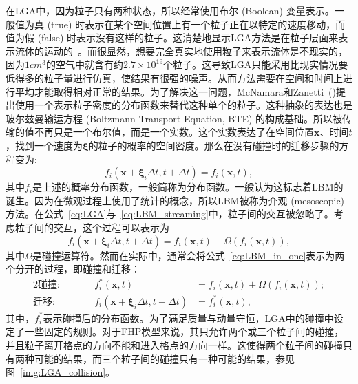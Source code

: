 在LGA中，因为粒子只有两种状态，所以经常使用布尔 (Boolean) 变量表示。一般值为真 (true) 时表示在某个空间位置上有一个粒子正在以特定的速度移动，而值为假 (false) 时表示没有这样的粒子。这清楚地显示LGA方法是在粒子层面来表示流体的运动的~\cite{wolf2004lattice}。而很显然，想要完全真实地使用粒子来表示流体是不现实的，因为$1cm^3$的空气中就含有约$2.7\times 10^{19}$个粒子。这导致LGA只能采用比现实情况要低得多的粒子量进行仿真，使结果有很强的噪声。从而方法需要在空间和时间上进行平均才能取得相对正常的结果。为了解决这一问题，McNamara和Zanetti~(\citeyear{mcnamara1988use})提出使用一个表示粒子密度的分布函数来替代这种单个的粒子。这种抽象的表达也是玻尔兹曼输运方程 (Boltzmann Transport Equation, BTE) 的构成基础。所以被传输的值不再只是一个布尔值，而是一个实数。这个实数表达了在空间位置$\mathbf{x}$、时间$t$，找到一个速度为$\mathbf{\xi}$的粒子的概率的空间密度。那么在没有碰撞时的迁移步骤的方程变为:
\begin{equation}
    f_{i}(\mathbf{x}+\mathbf{\xi}_i \Delta t,t+\Delta t)=f_{i}(\mathbf{x},t),
    \label{eq:LBM_streaming}
\end{equation}
其中$f_{i}$是上述的概率分布函数，一般简称为分布函数。一般认为这标志着LBM的诞生。因为在微观过程上使用了统计的概念，所以LBM被称为介观 (mesoscopic) 方法。在公式~\ref{eq:LGA}与~\ref{eq:LBM_streaming}中，粒子间的交互被忽略了。考虑粒子间的交互，这个过程可以表示为
\begin{equation}
    f_{i}(\mathbf{x}+\mathbf{\xi}_i \Delta t,t+\Delta t)=f_{i}(\mathbf{x},t)+\Omega(f_{i}(\mathbf{x},t)),
    \label{eq:LBM_in_one}
\end{equation}
其中$\Omega$是碰撞运算符。然而在实际中，通常会将公式~\ref{eq:LBM_in_one}表示为两个分开的过程，即碰撞和迁移：
\begin{alignat}{2}
\textbf{碰撞:} & \quad\quad &f_i^*(\boldsymbol{x}, t) & =f_i(\boldsymbol{x}, t)+\Omega\left(f_i(\boldsymbol{x}, t)\right); \\
\textbf{迁移:} & & f_i\left(\boldsymbol{x}+\boldsymbol{\xi}_i \Delta t, t+\Delta t\right) & =f_i^*(\boldsymbol{x}, t),
\end{alignat}
其中，$f_i^*$表示碰撞后的分布函数。为了满足质量与动量守恒，LGA中的碰撞中设定了一些固定的规则。对于FHP模型来说，其只允许两个或三个粒子间的碰撞，并且粒子离开格点的方向不能和进入格点的方向一样。这使得两个粒子间的碰撞只有两种可能的结果，而三个粒子间的碰撞只有一种可能的结果，参见图~\ref{img:LGA_collision}。


